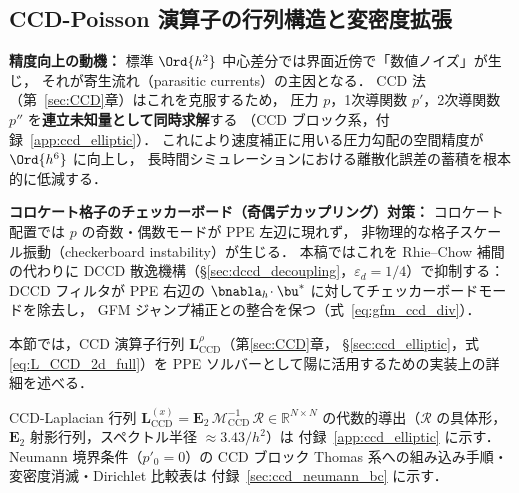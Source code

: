 %
%
\subsection{CCD-Poisson 演算子の行列構造と変密度拡張}
\label{sec:ccd_poisson_matrix}


\textbf{精度向上の動機：}
標準 $\Ord{h^2}$ 中心差分では界面近傍で「数値ノイズ」が生じ，
それが寄生流れ（parasitic currents）の主因となる．
CCD 法（第~\ref{sec:CCD}章）はこれを克服するため，
圧力 $p$，1次導関数 $p'$，2次導関数 $p''$ を\textbf{連立未知量として同時求解}する
（CCD ブロック系，付録~\ref{app:ccd_elliptic}）．
これにより速度補正に用いる圧力勾配の空間精度が $\Ord{h^6}$ に向上し，
長時間シミュレーションにおける離散化誤差の蓄積を根本的に低減する．

\textbf{コロケート格子のチェッカーボード（奇偶デカップリング）対策：}
コロケート配置では $p$ の奇数・偶数モードが PPE 左辺に現れず，
非物理的な格子スケール振動（checkerboard instability）が生じる．
本稿ではこれを Rhie--Chow 補間の代わりに
DCCD 散逸機構（§\ref{sec:dccd_decoupling}，$\varepsilon_d=1/4$）で抑制する：
DCCD フィルタが PPE 右辺の $\bnabla_h\!\cdot\bu^*$ に対してチェッカーボードモードを除去し，
GFM ジャンプ補正との整合を保つ（式~\eqref{eq:gfm_ccd_div}）．

本節では，CCD 演算子行列 $\mathbf{L}_{\mathrm{CCD}}^{\rho}$（第\ref{sec:CCD}章，
§\ref{sec:ccd_elliptic}，式 \eqref{eq:L_CCD_2d_full}）を
PPE ソルバーとして陽に活用するための実装上の詳細を述べる．


CCD-Laplacian 行列 $\mathbf{L}_{\mathrm{CCD}}^{(x)} = \mathbf{E}_2\,\mathcal{M}_{\mathrm{CCD}}^{-1}\,\mathcal{R} \in \mathbb{R}^{N \times N}$
の代数的導出（$\mathcal{R}$ の具体形，$\mathbf{E}_2$ 射影行列，スペクトル半径 $\approx 3.43/h^2$）は
付録~\ref{app:ccd_elliptic} に示す．
Neumann 境界条件（$p'_0 = 0$）の CCD ブロック Thomas 系への組み込み手順・変密度消滅・Dirichlet 比較表は
付録~\ref{sec:ccd_neumann_bc} に示す．

